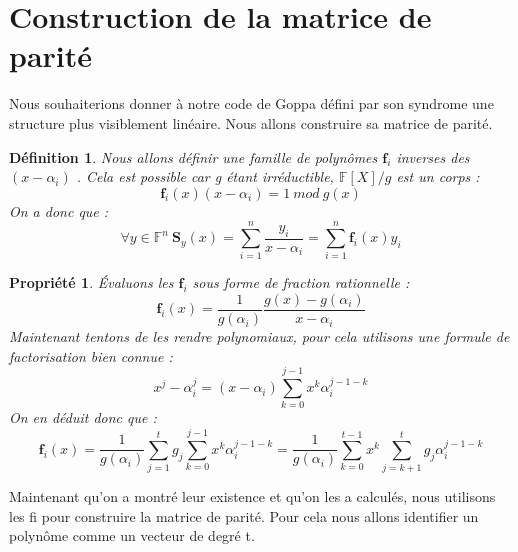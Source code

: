 \documentclass{article}
\newtheorem{prop}{Propriété}
\newtheorem{defi}{Définition}
\begin{document}
	\section{Construction de la matrice de parité}
		\label{parite}
		\cite{04cc}
		Nous souhaiterions donner à notre code de Goppa défini par son syndrome une structure plus visiblement linéaire. Nous allons construire sa matrice de parité.

		\begin{defi}
			Nous allons définir une famille de polynômes  $ \mathbf{f}_{i} $  inverses des  $ (x-\alpha_{i}) $ . Cela est possible car g étant irréductible,  $ \mathbb{F}[X]/g $  est un corps :
			 $$  \mathbf{f}_{i}(x)(x-\alpha_{i}) = 1 \ mod \ g(x) $$ 
			On a donc que :
			 $$ \forall y \in \mathbb{F}^{n} \ \mathbf{S}_{y}(x) = \sum_{i=1}^{n} \frac{y_{i}}{x-\alpha_{i}} = \sum_{i=1}^{n} \mathbf{f}_{i}(x)y_{i}  $$ 
		\end{defi}

		\begin{prop}
			Évaluons les  $ \mathbf{f}_{i} $  sous forme de fraction rationnelle :
			$$ \mathbf{f}_{i}(x) = \frac{1}{g(\alpha_{i})} \frac{g(x)-g(\alpha_{i})}{x-\alpha_{i}}  $$ 
			Maintenant tentons de les rendre polynomiaux, pour cela utilisons une formule de factorisation bien connue  :
			$$ x^{j} - \alpha_{i}^{j} = (x-\alpha_{i})\sum_{k=0}^{j-1} x^{k}\alpha_{i}^{j-1-k}$$
			On en déduit donc que :
			$$  \mathbf{f}_{i}(x) = \frac{1}{g(\alpha_{i})} \sum_{j=1}^{t} g_{j}\sum_{k=0}^{j-1} x^{k}\alpha_{i}^{j-1-k} 
			= \frac{1}{g(\alpha_{i})} \sum_{k=0}^{t-1} x^{k}\sum_{j=k+1}^{t} g_{j}\alpha_{i}^{j-1-k}$$
		\end{prop}

		Maintenant qu'on a montré leur existence et qu'on les a calculés, nous utilisons les fi pour construire la matrice de parité.
		Pour cela nous allons identifier un polynôme comme un vecteur de degré t.
\end{document}
